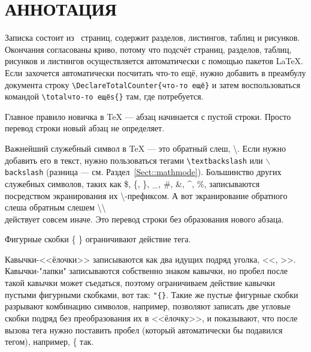 \documentclass[14pt, russian]{scrartcl}
\begin{document}

\setlength{\tabcolsep}{3pt}
\newpage
\setcounter{page}{2}
\section*{АННОТАЦИЯ}

Записка состоит из~\pageref{TotPages} страниц, содержит \totalsections{} разделов, \totallistings{} листингов, \totaltables{} таблиц и \totalfigures{} рисунков. Окончания согласованы криво, потому что подсчёт страниц, разделов, таблиц, рисунков и листингов осуществляется автоматически с помощью пакетов \LaTeX{}. Если захочется автоматически посчитать что-то ещё, нужно добавить в преамбулу документа строку \texttt{\textbackslash DeclareTotalCounter\{что-то ещё\}} и затем воспользоваться командой \texttt{\textbackslash totalчто-то ещёs\{\}} там, где потребуется.

\newpage
\renewcommand\contentsname{\hfill{\normalfont{СОДЕРЖАНИЕ}}\hfill}  %
\tableofcontents
\newpage
{}  %

Главное правило новичка в \TeX{} --- абзац начинается с пустой строки. Просто перевод строки новый абзац не определяет.

Важнейший служебный символ в \TeX{} --- это обратный слеш, \textbackslash. Если нужно добавить его в текст, нужно пользоваться тегами \texttt{\textbackslash textbackslash} или \texttt{$\backslash$backslash} (разница --- см. Раздел~\ref{Sect::mathmode}). Большинство других служебных символов, таких как \$, \{, \}, \_, \#, \&, \^{}, \%, записываются посредством экранирования их  \textbackslash -префиксом. А вот экранирование обратного слеша обратным слешем \textbackslash \textbackslash{} \\ действует совсем иначе. Это перевод строки без образования нового абзаца.

Фигурные скобки \{ \} ограничивают действие тега. 

Кавычки-<<ёлочки>> записываются как два идущих подряд уголка, <{}<, >{}>. Кавычки-"лапки"{} записываются собственно знаком кавычки, но пробел после такой кавычки может съедаться, поэтому ограничиваем действие кавычки пустыми фигурными скобками, вот так: \texttt{"\{\}}. Такие же пустые фигурные скобки разрывают комбинацию символов, например, позволяют записать две угловые скобки подряд без преобразования их в <<ёлочку>>, и показывают, что после вызова тега нужно поставить пробел (который автоматически бы подавился тегом), например, \{{} так.
\end{document}
